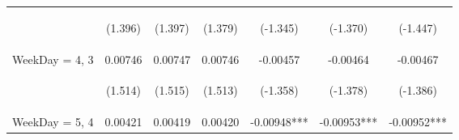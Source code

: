 \documentclass{standalone}
\begin{document}
\begin{tabular}{lcccccc}
    \vspace{4pt}     & \begin{footnotesize}(1.396)\end{footnotesize}   & \begin{footnotesize}(1.397)\end{footnotesize}   & \begin{footnotesize}(1.379)\end{footnotesize}   & \begin{footnotesize}(-1.345)\end{footnotesize} & \begin{footnotesize}(-1.370)\end{footnotesize} & \begin{footnotesize}(-1.447)\end{footnotesize} \\
    WeekDay = 4, 3   & 0.00746                                         & 0.00747                                         & 0.00746                                         & -0.00457                                       & -0.00464                                       & -0.00467                                       \\
    \vspace{4pt}     & \begin{footnotesize}(1.514)\end{footnotesize}   & \begin{footnotesize}(1.515)\end{footnotesize}   & \begin{footnotesize}(1.513)\end{footnotesize}   & \begin{footnotesize}(-1.358)\end{footnotesize} & \begin{footnotesize}(-1.378)\end{footnotesize} & \begin{footnotesize}(-1.386)\end{footnotesize} \\
    WeekDay = 5, 4   & 0.00421                                         & 0.00419                                         & 0.00420                                         & -0.00948***                                    & -0.00953***                                    & -0.00952***                                    \\

\end{tabular}
\end{document}
